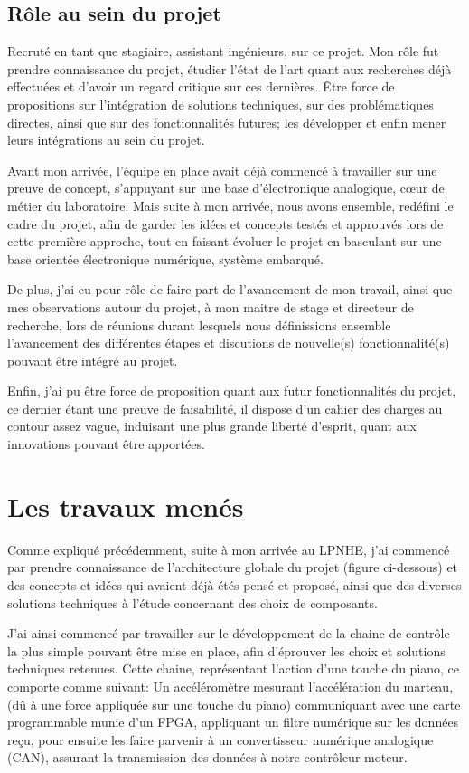 \documentclass[french,a4paper,12pt]{report}
\begin{document}
	\section{Rôle au sein du projet}	
	
	Recruté en tant que stagiaire, assistant ingénieurs, sur ce projet. Mon rôle fut prendre connaissance du projet, étudier l'état de l'art quant aux recherches déjà effectuées et d'avoir un regard critique sur ces dernières. Être force de propositions sur l'intégration de solutions techniques, sur des problématiques directes, ainsi que sur des fonctionnalités futures; les développer et enfin mener leurs intégrations au sein du projet.
	
	Avant mon arrivée, l'équipe en place avait déjà commencé à travailler sur une preuve de concept, s'appuyant sur une base d'électronique analogique, cœur de métier du laboratoire. Mais suite à mon arrivée, nous avons ensemble, redéfini le cadre du projet, afin de garder les idées et concepts testés et approuvés lors de cette première approche, tout en faisant évoluer le projet en basculant sur une base orientée électronique numérique, système embarqué.
	
	De plus, j'ai eu pour rôle de faire part de l'avancement de mon travail, ainsi que mes observations autour du projet, à mon maitre de stage et directeur de recherche, lors de réunions durant lesquels nous définissions ensemble l'avancement des différentes étapes et discutions de nouvelle(s) fonctionnalité(s) pouvant être intégré au projet.
	
	Enfin, j'ai pu être force de proposition quant aux futur fonctionnalités du projet, ce dernier étant une preuve de faisabilité, il dispose d'un cahier des charges au contour assez vague, induisant une plus grande liberté d'esprit, quant aux innovations pouvant être apportées.	
	
	
	\chapter{Les travaux menés}
	
	Comme expliqué précédemment, suite à mon arrivée au LPNHE, j'ai commencé par prendre connaissance de l'architecture globale du projet (figure ci-dessous) et des concepts et idées qui avaient déjà étés pensé et proposé, ainsi que des diverses solutions techniques à l'étude concernant des choix de composants.
	
	J'ai ainsi commencé par travailler sur le développement de la chaine de contrôle la plus simple pouvant être mise en place, afin d'éprouver les choix et solutions techniques retenues.
	Cette chaine, représentant l'action d'une touche du piano, ce comporte comme suivant: Un accéléromètre mesurant l'accélération du marteau, (dû à une force appliquée sur une touche du piano) communiquant avec une carte programmable munie d'un FPGA, appliquant un filtre numérique sur les données reçu, pour ensuite les faire parvenir à un convertisseur numérique analogique (CAN), assurant la transmission des données à notre contrôleur moteur.\newline
	
\end{document}
